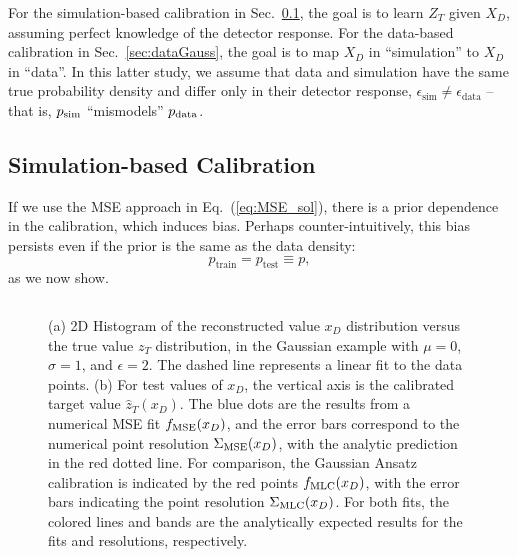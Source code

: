 \documentclass[aps,prd,reprint,preprintnumbers,superscriptaddress,nofootinbib,longbibliography,floatfix]{revtex4-1}
\DeclareRobustCommand{\Sec}[1]{Sec.~\ref{sec:#1}}
\DeclareRobustCommand{\Eq}[1]{Eq.~(\ref{eq:#1})}
\begin{document}
For the simulation-based calibration in \Sec{simGauss}, the goal is to learn $Z_T$ given $X_D$, assuming perfect knowledge of the detector response.
%
For the data-based calibration in \Sec{dataGauss}, the goal is to map $X_D$ in ``simulation'' to $X_D$ in ``data''.
%
In this latter study, we assume that data and simulation have the same true probability density and differ only in their detector response, $\epsilon_\text{sim}\neq \epsilon_\text{data}$ -- that is, $p_{\rm sim}$  ``mismodels'' $p_{\rm data}$. 

\subsection{Simulation-based Calibration}
\label{sec:simGauss}

If we use the MSE approach in \Eq{MSE_sol}, there is a prior dependence in the calibration, which induces bias.
%
Perhaps counter-intuitively, this bias persists even if the prior is the same as the data density:
%
\begin{equation}
\label{eq:equal_prior}
p_\text{train}=p_\text{test}\equiv p,
\end{equation}
%
as we now show.

\begin{figure*}[t]
    \centering
    $\qquad$
    \caption{
        (a) 
        2D Histogram of the reconstructed value $x_D$ distribution versus the true value $z_T$ distribution, in the Gaussian example with $\mu=0$, $\sigma=1$, and $\epsilon=2$.
        The dashed line represents a linear fit to the data points.
        (b)
        For test values of $x_D$, the vertical axis is the calibrated target value $ \hat{z}_T(x_D)$.
        The blue dots are the results from a numerical MSE fit $f_{\rm MSE}(x_D)$, and the error bars correspond to the numerical point resolution $\Sigma_{\rm MSE}(x_D)$, with the analytic prediction in the red dotted line.
        For comparison, the Gaussian Ansatz calibration is indicated by the red points $f_{\rm MLC}(x_D)$, with the error bars indicating the point resolution $\Sigma_{\rm MLC}(x_D)$.
        For both fits, the colored lines and bands are the analytically expected results for the fits and resolutions, respectively.
        }
    \label{fig:gauss1}
\end{figure*}
\end{document}
